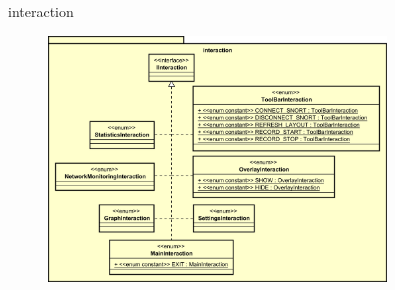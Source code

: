 \begin{frame}{interaction}
  \begin{figure}
    \centering
    \includegraphics[width=0.8\textwidth]{./images/interaction.png}
  \end{figure}
\end{frame}
